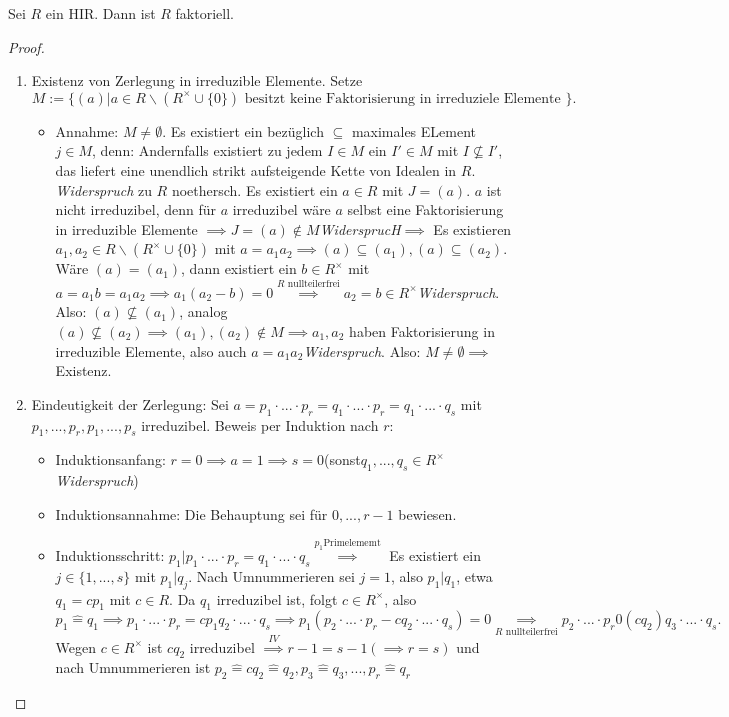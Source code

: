 \documentclass[a4paper, titlepage]{article}
\theoremstyle{definition}
\begin{document}
    \begin{satz}
        Sei $R$ ein HIR. Dann ist $R$ faktoriell.
    \end{satz}
\begin{proof} 
    \begin{enumerate}
        \item Existenz von Zerlegung in irreduzible Elemente. Setze $M:=\{(a)|a\in R\backslash(R^{\times}\cup\{0\}) \text{ besitzt keine Faktorisierung in irreduziele Elemente }\}.$
        \begin{itemize}
            \item Annahme: $M\neq \emptyset $. Es existiert ein bezüglich $\subseteq$ maximales ELement $j\in M$, denn: Andernfalls existiert zu jedem $I\in M$ ein $I'\in M$ mit $I\not\subseteq I'$, das liefert eine unendlich strikt aufsteigende Kette von Idealen in $R$. \textit{Widerspruch} zu $R$ noethersch.
                Es existiert ein $a\in R $ mit $J=(a)$. $a$ ist nicht irreduzibel, denn für $a$ irreduzibel wäre $a$ selbst eine Faktorisierung in irreduzible Elemente $\implies J=(a)\not\in M $\textit{WidersprucH}$\implies $ Es existieren $a_1,a_2\in  R\backslash(R^{\times}\cup \{0\})$ mit $a=a_1a_2 \implies (a)\subseteq (a_1), (a)\subseteq (a_2).$ Wäre $(a)=(a_1)$, dann existiert ein $b\in R^{\times}$ mit $a=a_1b=a_1a_2\implies a_1(a_2-b)=0\overset{R \text{ nullteilerfrei}}{\implies} a_2=b\in R^{\times}$\textit{Widerspruch}. Also: $(a)\not\subseteq (a_1)$, analog $(a)\not\subseteq (a_2) \implies (a_1),(a_2)\not\in M \implies a_1,a_2$ haben Faktorisierung in irreduzible Elemente, also auch $a=a_1a_2$\textit{Widerspruch}. Also: $M\neq \emptyset \implies $ Existenz. 
        \end{itemize} 
        \item Eindeutigkeit der Zerlegung: Sei $a=p_1\cdot ... \cdot p_r=q_1\cdot ...\cdot p_r =q_1\cdot ... \cdot q_s$ mit $p_1,...,p_r,p_1,...,p_s$ irreduzibel. Beweis per Induktion nach $r$:
            \begin{itemize}
                \item Induktionsanfang: $r=0\implies a=1\implies s=0$(sonst$q_1,...,q_s\in R^{\times}$\textit{Widerspruch})
                \item Induktionsannahme: Die Behauptung sei für $0,...,r-1$ bewiesen. 
                \item Induktionsschritt: $p_1|p_1\cdot ... \cdot p_r = q_1\cdot ... \cdot q_s\overset{p_1 \text{Primelememt}}{\implies} $ Es existiert ein $j\in\{1,...,s\}$ mit $p_1|q_j$. Nach Umnummerieren sei $j=1$, also $p_1|q_1$, etwa $q_1=cp_1$ mit $c\in R$. Da $q_1$ irreduzibel ist, folgt $c\in R^{\times}$, also $p_1\widehat=q_1 \implies p_1\cdot ... \cdot p_r = cp_1q_2\cdot ... \cdot q_s \implies p_1(p_2\cdot ... \cdot p_r-cq_2\cdot ... \cdot q_s)=0\underset{R \text{ nullteilerfrei}}{\implies} p_2\cdot ... \cdot p_r0(cq_2)q_3\cdot...\cdot q_s.$ Wegen $c\in R^{\times}$ ist $cq_2$ irreduzibel $\overset{IV}{\implies } r-1=s-1(\implies r=s)$ und nach Umnummerieren ist $p_2\widehat=cq_2\widehat=q_2,p_3\widehat=q_3,...,p_r\widehat=q_r$
            \end{itemize}
        \end{enumerate}
	\end{proof}
\end{document}
